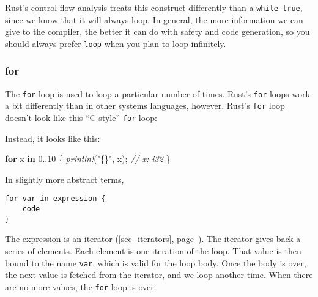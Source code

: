 \documentclass[a4paper,]{book}
\renewcommand*{\hyperref}[2][\ar]{%
  \def\ar{#2}%
  #2 (\autoref{#1}, page~\pageref{#1})}
\newenvironment{Shaded}{\begin{snugshade}}{\end{snugshade}}
\newcommand{\KeywordTok}[1]{\textcolor[rgb]{0.13,0.29,0.53}{\textbf{{#1}}}}
\newcommand{\DecValTok}[1]{\textcolor[rgb]{0.00,0.00,0.81}{{#1}}}
\newcommand{\CharTok}[1]{\textcolor[rgb]{0.31,0.60,0.02}{{#1}}}
\newcommand{\StringTok}[1]{\textcolor[rgb]{0.31,0.60,0.02}{{#1}}}
\newcommand{\CommentTok}[1]{\textcolor[rgb]{0.56,0.35,0.01}{\textit{{#1}}}}
\newcommand{\PreprocessorTok}[1]{\textcolor[rgb]{0.56,0.35,0.01}{\textit{{#1}}}}
\newcommand{\NormalTok}[1]{{#1}}
\begin{document}
Rust's control-flow analysis treats this construct differently than a
\texttt{while\ true}, since we know that it will always loop. In
general, the more information we can give to the compiler, the better it
can do with safety and code generation, so you should always prefer
\texttt{loop} when you plan to loop infinitely.

\subsubsection{for}\label{for}

The \texttt{for} loop is used to loop a particular number of times.
Rust's \texttt{for} loops work a bit differently than in other systems
languages, however. Rust's \texttt{for} loop doesn't look like this
``C-style'' \texttt{for} loop:

\begin{Shaded}
\end{Shaded}

Instead, it looks like this:

\begin{Shaded}
\begin{Highlighting}[]
\KeywordTok{for} \NormalTok{x }\KeywordTok{in} \DecValTok{0.}\NormalTok{.}\DecValTok{10} \NormalTok{\{}
    \PreprocessorTok{println!}\NormalTok{(}\StringTok{"\{\}"}\NormalTok{, x); }\CommentTok{// x: i32}
\NormalTok{\}}
\end{Highlighting}
\end{Shaded}

In slightly more abstract terms,

\begin{verbatim}
for var in expression {
    code
}
\end{verbatim}

The expression is an \hyperref[sec--iterators]{iterator}. The iterator
gives back a series of elements. Each element is one iteration of the
loop. That value is then bound to the name \texttt{var}, which is valid
for the loop body. Once the body is over, the next value is fetched from
the iterator, and we loop another time. When there are no more values,
the \texttt{for} loop is over.
\end{document}
